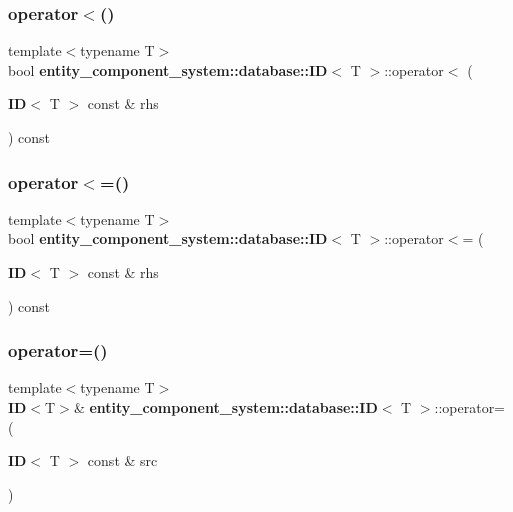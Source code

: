 \subsubsection{operator$<$()}
{\footnotesize\ttfamily template$<$typename T$>$ \\
bool {\bf entity\+\_\+component\+\_\+system\+::database\+::\+ID}$<$ T $>$\+::operator$<$ (\begin{DoxyParamCaption}\item[{{\bf ID}$<$ T $>$ const \&}]{rhs }\end{DoxyParamCaption}) const\hspace{0.3cm}{\ttfamily [inline]}}

\label{classentity__component__system_1_1database_1_1_i_d_ad9f2a2ee834a135026a2c8beb611fb15} 
\subsubsection{operator$<$=()}
{\footnotesize\ttfamily template$<$typename T$>$ \\
bool {\bf entity\+\_\+component\+\_\+system\+::database\+::\+ID}$<$ T $>$\+::operator$<$= (\begin{DoxyParamCaption}\item[{{\bf ID}$<$ T $>$ const \&}]{rhs }\end{DoxyParamCaption}) const\hspace{0.3cm}{\ttfamily [inline]}}

\label{classentity__component__system_1_1database_1_1_i_d_a0a6747e60880a92dff37ebb78f785085} 
\subsubsection{operator=()\hspace{0.1cm}{\footnotesize\ttfamily [1/2]}}
{\footnotesize\ttfamily template$<$typename T$>$ \\
{\bf ID}$<$T$>$\& {\bf entity\+\_\+component\+\_\+system\+::database\+::\+ID}$<$ T $>$\+::operator= (\begin{DoxyParamCaption}\item[{{\bf ID}$<$ T $>$ const \&}]{src }\end{DoxyParamCaption})\hspace{0.3cm}{\ttfamily [inline]}}

